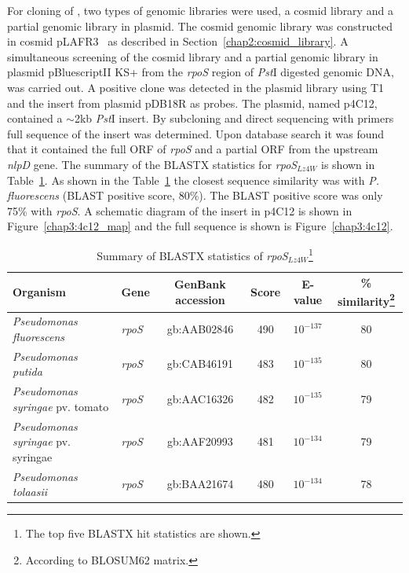 For cloning of , two types of genomic libraries were used,
a cosmid library and a partial genomic library in plasmid. The
cosmid  genomic library was constructed in cosmid
pLAFR3~\citep{Staskawicz1987} as described in
Section~\ref{chap2:cosmid_library}. A simultaneous screening of
the cosmid library and a partial genomic library in plasmid
pBluescriptII KS+ from the \emph{rpoS} region of \emph{Pst}I
digested genomic DNA, was carried out. A positive clone was
detected in the plasmid library using T1 and the insert from
plasmid pDB18R as probes. The plasmid, named p4C12, contained a
\U{$\sim$2}{kb} \emph{Pst}I insert. By subcloning and direct
sequencing with primers full sequence of the insert was
determined. Upon database search it was found that it contained
the full ORF of \emph{rpoS} and a partial ORF from the upstream
\emph{nlpD} gene. The summary of the BLASTX statistics for
\emph{rpoS}$_{Lz4W}$ is shown in Table~\ref{chap3:4c12_blast}. As
shown in the Table~\ref{chap3:4c12_blast} the closest sequence
similarity was with \emph{P. fluorescens} (BLAST positive score,
80\%). The BLAST positive score was only 75\% with 
\emph{rpoS}. A schematic diagram of the insert in p4C12 is shown
in Figure~\ref{chap3:4c12_map} and the full sequence is shown is
Figure~\ref{chap3:4c12}.


\begin{table}[tbp]
\begin{minipage}[c]{\textwidth}

\renewcommand{\footnoterule}{}
\caption[Summary of BLASTX statistics of
\emph{rpoS}$_{Lz4W}$]{Summary of BLASTX statistics of
\emph{rpoS}$_{Lz4W}$\protect\footnote{The top five BLASTX hit
statistics are shown.}} \label{chap3:4c12_blast}
\begin{narrow}{-1in}{-1in}
\centering
\begin{small}
\begin{tabular}{@{}llcccc@{}}\toprule
\textbf{Organism} & \textbf{Gene} &
\multicolumn{1}{p{0.7in}}{\textbf{GenBank accession}} &
\textbf{Score} & \textbf{E-value} & \textbf{\%
similarity}\protect\footnote{According to BLOSUM62
matrix.}\\\midrule\addlinespace \emph{Pseudomonas fluorescens} &
\emph{rpoS} & gb:AAB02846
 & 490 & $10^{-137}$ & 80 \\
\emph{Pseudomonas putida} & \emph{rpoS} & gb:CAB46191
 & 483 &$10^{-135}$ & 80\\
\emph{Pseudomonas syringae} pv. tomato & \emph{rpoS} & gb:AAC16326 & 482  & $10^{-135}$ & 79\\
\emph{Pseudomonas syringae} pv. syringae & \emph{rpoS} &
gb:AAF20993 & 481 &
$10^{-134}$ & 79\\
\emph{Pseudomonas tolaasii} & \emph{rpoS} & gb:BAA21674 & 480 & $10^{-134}$ & 78 \\
\bottomrule
\end{tabular}
\end{small}
\end{narrow}
\end{minipage}
\end{table}

